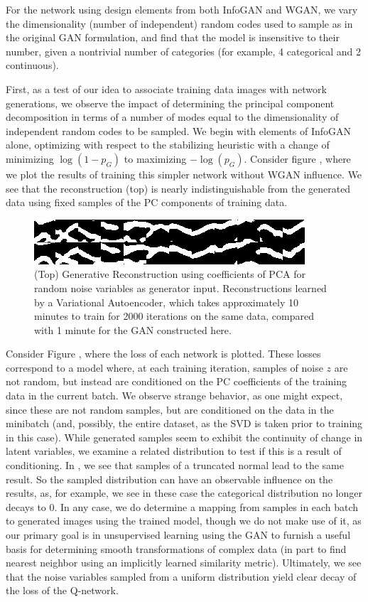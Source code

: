 \documentclass{article}
\begin{document}
For the network using design elements from both InfoGAN and WGAN, we vary the dimensionality (number of independent) random codes used to sample as in the original GAN formulation, and find that the model is insensitive to their number, given a nontrivial number of categories (for example, 4 categorical and 2 continuous).

First, as a test of our idea to associate training data images with network generations, we observe the impact of determining the principal component decomposition in terms of a number of modes equal to the dimensionality of independent random codes to be sampled.  We begin with elements of InfoGAN alone, optimizing with respect to the stabilizing heuristic with a change of minimizing $\log(1-p_G)$ to maximizing $-\log(p_G)$. Consider figure \label{mapPCA}, where we plot the results of training this simpler network without WGAN influence.  We see that the reconstruction (top) is nearly indistinguishable from the generated data using fixed samples of the PC components of training data.


\begin{figure}[h]
\centering
  \includegraphics[]{figures/pcamap.png}
  \caption{ (Top) Generative Reconstruction using coefficients of PCA for random noise variables as generator input.  Reconstructions learned by a Variational Autoencoder, which takes approximately 10 minutes to train for 2000 iterations on the same data, compared with 1 minute for the GAN constructed here.}
\end{figure}\label{mapPCA}

Consider Figure \label{zPCA}, where the loss of each network is plotted.  These losses correspond to a model where, at each training iteration, samples of noise $z$ are not random, but instead are conditioned on the PC coefficients of the training data in the current batch. We observe strange behavior, as one might expect, since these are not random samples, but are conditioned on the data in the minibatch (and, possibly, the entire dataset, as the SVD is taken prior to training in this case).  While generated samples seem to exhibit the continuity of change in latent variables, we examine a related distribution to test if this is a result of conditioning.  In \label{tnorm}, we see that samples of a truncated normal lead to the same result.  So the sampled distribution can have an observable influence on the results, as, for example, we see in these case the categorical distribution no longer decays to $0$.  In any case, we do determine a mapping from samples in each batch to generated images using the trained model, though we do not make use of it, as our primary goal is in unsupervised learning using the GAN to furnish a useful basis for determining smooth transformations of complex data (in part to find nearest neighbor using an implicitly learned similarity metric).
Ultimately, we see that the noise variables sampled from a uniform distribution yield clear decay of the loss of the Q-network.
\end{document}

